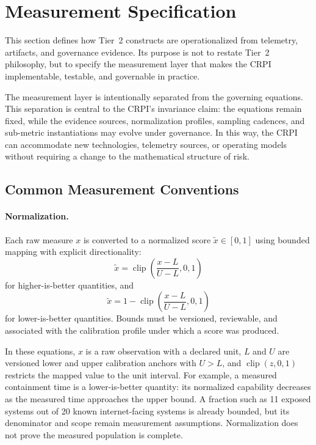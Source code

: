 \documentclass[11pt]{article}
\newcommand{\clip}{\operatorname{clip}}
\begin{document}
\section{Measurement Specification}
\label{sec:measurement}
This section defines how Tier~2 constructs are operationalized from telemetry,
artifacts, and governance evidence. Its purpose is not to restate Tier~2 philosophy,
but to specify the measurement layer that makes the CRPI implementable, testable, and
governable in practice.

The measurement layer is intentionally separated from the governing equations. This
separation is central to the CRPI’s invariance claim: the equations remain fixed, while
the evidence sources, normalization profiles, sampling cadences, and sub-metric
instantiations may evolve under governance. In this way, the CRPI can accommodate new
technologies, telemetry sources, or operating models without requiring a change to the
mathematical structure of risk.

\subsection{Common Measurement Conventions}
\paragraph{Normalization.}
Each raw measure $x$ is converted to a normalized score $\widetilde{x}\in[0,1]$ using
bounded mapping with explicit directionality:
\begin{equation}
  \widetilde{x}=\clip\left(\frac{x-L}{U-L},0,1\right)
\end{equation}
for higher-is-better quantities, and
\begin{equation}
  \widetilde{x}=1-\clip\left(\frac{x-L}{U-L},0,1\right)
\end{equation}
for lower-is-better quantities. Bounds must be versioned, reviewable, and associated
with the calibration profile under which a score was produced.


In these equations, $x$ is a raw observation with a declared unit,
$L$ and $U$ are versioned lower and upper calibration anchors with
$U>L$, and $\clip(z,0,1)$ restricts the mapped value to the unit
interval. For example, a measured containment time is a
lower-is-better quantity: its normalized capability decreases
as the measured time approaches the upper bound. A fraction such as
11 exposed systems out of 20 known internet-facing systems is already
bounded, but its denominator and scope remain measurement assumptions.
Normalization does not prove the measured population is complete.
\end{document}
